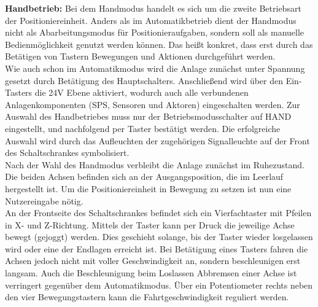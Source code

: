 \documentclass[../Bachelorarbeit.tex]{subfiles}
\begin{document}
\smallskip
\newline
\textbf{Handbetrieb:} Bei dem Handmodus handelt es sich um die zweite Betriebsart der Positioniereinheit. Anders als im Automatikbetrieb dient der Handmodus nicht als Abarbeitungsmodus für Positionieraufgaben, sondern soll als manuelle Bedienmöglichkeit genutzt werden können. Das heißt konkret, dass erst durch das Betätigen von Tastern Bewegungen und Aktionen durchgeführt werden.\\
Wie auch schon im Automatikmodus wird die Anlage zunächst unter Spannung gesetzt durch Betätigung des Hauptschalters. Anschließend wird über den Ein-Tasters die 24V Ebene aktiviert, wodurch auch alle verbundenen Anlagenkomponenten (SPS, Sensoren und Aktoren) eingeschalten werden. Zur Auswahl des Handbetriebes muss nur der Betriebsmodusschalter auf \glqq HAND\grqq{} eingestellt, und nachfolgend per Taster bestätigt werden. Die erfolgreiche Auswahl wird durch das Aufleuchten der zugehörigen Signalleuchte auf der Front des Schaltschrankes symbolisiert.\\
Nach der Wahl des Handmodus verbleibt die Anlage zunächst im Ruhezustand. Die beiden Achsen befinden sich an der Ausgangsposition, die im Leerlauf hergestellt ist. Um die Positioniereinheit in Bewegung zu setzen ist nun eine Nutzereingabe nötig.\\
An der Frontseite des Schaltschrankes befindet sich ein Vierfachtaster mit Pfeilen in X- und Z-Richtung. Mittels der Taster kann per Druck die jeweilige Achse bewegt (gejoggt) werden. Dies geschieht solange, bis der Taster wieder losgelassen wird oder eine der Endlagen erreicht ist. Bei Betätigung eines Tasters fahren die Achsen jedoch nicht mit voller Geschwindigkeit an, sondern beschleunigen erst langsam. Auch die Beschleunigung beim Loslassen \bzw Abbremsen einer Achse ist verringert gegenüber dem Automatikmodus. Über ein Potentiometer rechts neben den vier Bewegungstastern kann die Fahrtgeschwindigkeit reguliert werden.\\
\end{document}
